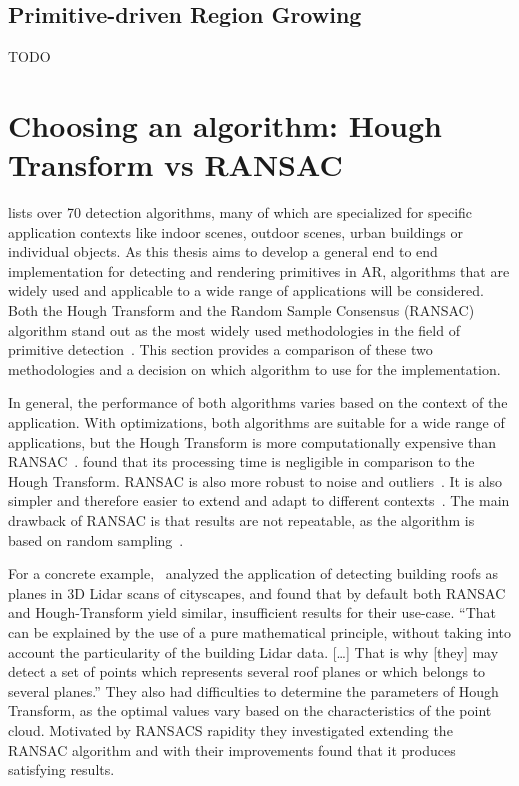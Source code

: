 \subsection{Primitive-driven Region Growing}
TODO


\section{Choosing an algorithm: Hough Transform vs RANSAC}

\cite{kaiser_survey_2019} lists over 70 detection algorithms, many of which are specialized for specific application contexts
like indoor scenes, outdoor scenes, urban buildings or individual objects.
As this thesis aims to develop a general end to end implementation for detecting and rendering primitives in AR,
algorithms that are widely used and applicable to a wide range of applications will be considered.
Both the Hough Transform and the Random Sample Consensus (RANSAC) algorithm stand out as the
most widely used methodologies in the field of primitive detection~\parencite{schnabel_efficient_2007}.
This section provides a comparison of these two methodologies and a decision on which algorithm to use for the implementation.

In general, the performance of both algorithms varies based on the context of the application.
With optimizations, both algorithms are suitable for a wide range of applications, but
the Hough Transform is more computationally expensive than RANSAC~\parencite{kaiser_survey_2019}.
\cite{tarsha-kurdi_hough-transform_2007} found that its processing time is negligible in comparison to the Hough Transform.
RANSAC is also more robust to noise and outliers~\parencite{kaiser_survey_2019}.
It is also simpler and therefore easier to extend and adapt to different contexts~\parencite{tarsha-kurdi_hough-transform_2007, kaiser_survey_2019}.
The main drawback of RANSAC is that results are not repeatable, as the algorithm is based on random sampling~\parencite{kaiser_survey_2019}.


For a concrete example,~\cite{tarsha-kurdi_hough-transform_2007} analyzed the application of detecting building
roofs as planes in 3D Lidar scans of cityscapes, and found that by default both RANSAC and Hough-Transform yield similar,
insufficient results for their use-case.
“That can be explained by the use of a pure mathematical principle,
without taking into account the particularity of the building Lidar data. […] That is why
[they] may detect a set of points which represents several roof planes or which belongs to several planes.”
They also had difficulties to determine the parameters of Hough Transform,
as the optimal values vary based on the characteristics of the point cloud.
Motivated by RANSACS rapidity they investigated extending the RANSAC algorithm and with their improvements
found that it produces satisfying results.

